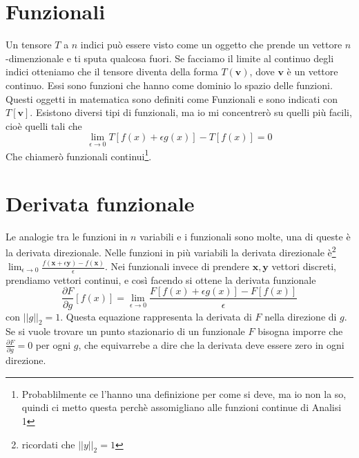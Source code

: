 \documentclass[11pt,a4paper]{report}
\newcommand{\vettore}[1]{\mathbf{#1}}
\theoremstyle{definition}
\theoremstyle{plain}
\theoremstyle{plain}
\begin{document}
		\section{Funzionali}
			Un tensore $T$ a $n$ indici può essere visto come un oggetto che prende un vettore $n$-dimenzionale e ti sputa qualcosa fuori.
			Se facciamo il limite al continuo degli indici otteniamo che il tensore diventa della forma $T(\vettore v)$, dove $\vettore v$ è un vettore continuo.\newline
			Essi sono funzioni che hanno come dominio lo spazio delle funzioni. Questi oggetti in matematica sono definiti come Funzionali e sono indicati con $T[\vettore v]$.\newline
			Esistono diversi tipi di funzionali, ma io mi concentrerò su quelli più facili, cioè quelli tali che
			\begin{equation}
				\lim_{\epsilon 	\to 0}T[f(x)+\epsilon g(x)]-T[f(x)]=0
			\end{equation}
			Che chiamerò funzionali continui\footnote{Probablilmente ce l'hanno una definizione per come si deve, ma io non la so, quindi ci metto questa perchè assomigliano alle funzioni continue di Analisi 1}.



		\section{Derivata funzionale}
			Le analogie tra le funzioni in $n$ variabili e i funzionali sono molte, una di queste è la derivata direzionale.\newline
			Nelle funzioni in più variabili la derivata direzionale è\footnote{ricordati che $||y||_2=1$} $\lim_{\epsilon \to 0}\frac{f(\mathbf{x}+\epsilon\mathbf{y})-f(\mathbf{x})}{\epsilon}$. Nei funzionali invece di prendere $\mathbf{x},\mathbf{y}$ vettori discreti, prendiamo vettori continui, e così facendo si ottene la derivata funzionale
			\begin{equation}
				\frac{\partial F}{\partial g}[f(x)]=\lim_{\epsilon \to 0}\frac{F[f(x)+\epsilon g(x)]-F[f(x)]}{\epsilon}
			\end{equation}
			con $||g||_2=1$. Questa equazione rappresenta la derivata di $F$ nella direzione di $g$.\newline
			Se si vuole trovare un punto stazionario di un funzionale $F$ bisogna imporre che $\frac{\partial F}{\partial g}=0$ per ogni $g$, che equivarrebe a dire che la derivata deve essere zero in ogni direzione.\newline
\end{document}
